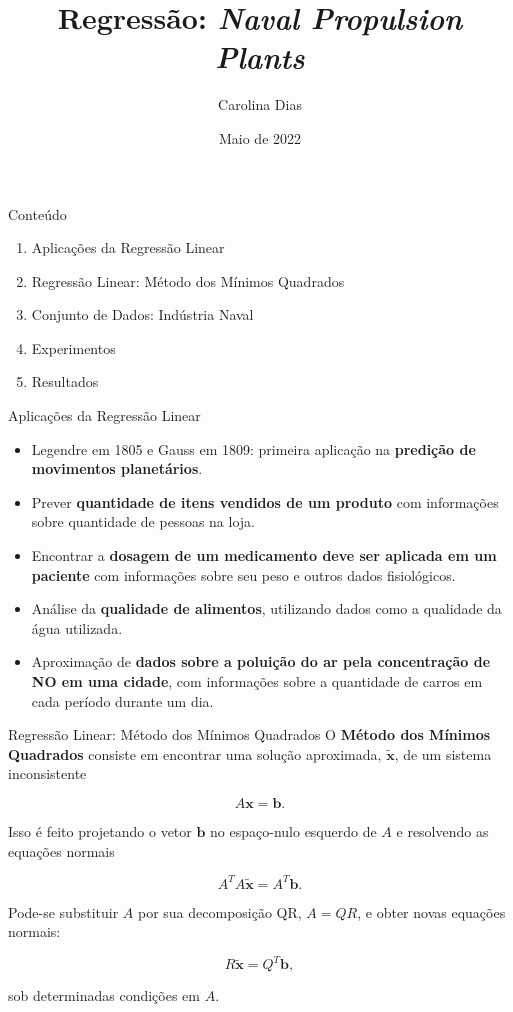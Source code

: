 \documentclass{beamer}
\title{Regressão: \textit{Naval Propulsion Plants}}
\author{Carolina Dias}
\date{Maio de 2022}
\theoremstyle{definition}
\begin{document}
\maketitle

\begin{frame}{Conteúdo}
\begin{enumerate}
    \item Aplicações da Regressão Linear
    \item Regressão Linear: Método dos Mínimos Quadrados
    \item Conjunto de Dados: Indústria Naval
    \item Experimentos
    \item Resultados
\end{enumerate}
\end{frame}


\begin{frame}{Aplicações da Regressão Linear}
\justifying
\begin{itemize}
    \item Legendre em 1805 e Gauss em 1809: primeira aplicação na \textbf{predição de movimentos planetários}.
    \pause
    \item Prever \textbf{quantidade de itens vendidos de um produto} com informações sobre quantidade de pessoas na loja.
    \pause
    \item Encontrar a \textbf{dosagem de um medicamento deve ser aplicada em um paciente} com informações sobre seu peso e outros dados fisiológicos.
    \pause
    \item Análise da \textbf{qualidade de alimentos}, utilizando dados como a qualidade da água utilizada.
    \pause
    \item Aproximação de \textbf{dados sobre a poluição do ar pela concentração de NO em uma cidade}, com informações sobre a quantidade de carros em cada período durante um dia.
\end{itemize}
    
\end{frame}


\begin{frame}{Regressão Linear: Método dos Mínimos Quadrados}
\justifying
O \textbf{Método dos Mínimos Quadrados} consiste em encontrar uma solução aproximada, $\mathbf{\tilde{x}}$, de um sistema inconsistente

$$A\mathbf{x} = \mathbf{b}.$$

Isso é feito projetando o vetor $\mathbf{b}$ no espaço-nulo esquerdo de $A$ e resolvendo as equações normais

$$A^TA\mathbf{\tilde{x}} = A^T\mathbf{b}.$$

Pode-se substituir $A$ por sua decomposição QR, $A = QR$, e obter novas equações normais:

$$R\mathbf{\tilde{x}} = Q^T\mathbf{b},$$

sob determinadas condições em $A$.
    
\end{frame}
\end{document}
